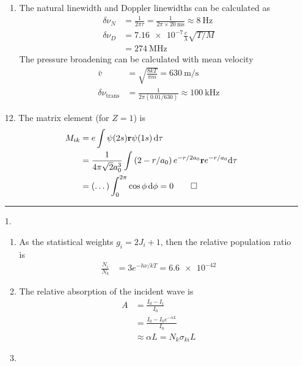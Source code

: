\documentclass{homework}
\begin{document}
\begin{enumerate}
\begin{enumerate}
			\item The natural linewidth and Doppler linewidths can be calculated as \begin{align*}
				\delta \nu_N & = \frac{1}{2 \pi \tau} = \frac{1}{2 \pi \times \SI{20}{\ms}} \approx \SI{8}{\Hz} \\
				\delta \nu_D & = \num{7.16e-7} \frac{c}{\lambda} \sqrt{T/M} \\
					& = \SI{274}{\MHz}
			\end{align*}
			The pressure broadening can be calculated with mean velocity \begin{align*}
				\bar{v} & = \sqrt{ \frac{8kT}{\pi m} } = \SI{630}{\m\per\s} \\
				\delta \nu_\mathrm{trans} & = \frac{1}{2 \pi (0.01 / 630)} \approx \SI{100}{\kHz}
			\end{align*}
		\end{enumerate}
		
		\item[12.] The matrix element (for $Z=1$) is \begin{align*}
			M_{ik} & = e \int \psi(2s) \boldsymbol{\mathrm{r}} \psi(1s) \dd{\tau} \\
				& = \frac{1}{4 \pi \sqrt{2} a_0^3} \int \left(2 - r/a_0\right) e^{-r/2a_0} \boldsymbol{\mathrm{r}} e^{-r/a_0} \dd\tau \\
				& = \left(\dots\right) \int_0^{2 \pi} \cos \phi \dd{\phi} = 0 \qed
		\end{align*}
		
		\vspace{1em}
		\hrule
		
		\item[1.] \begin{enumerate}
			\item As the statistical weights $g_i = 2 J_i  + 1$, then the relative population ratio is \begin{align*}
					\frac{N_i}{N_k} & = 3e^{-h\nu / kT} = \num{6.6e-42}
				\end{align*}
			
			\item The relative absorption of the incident wave is \begin{align*}
				A & = \frac{I_0 - I_t}{I_0} \\
					& = \frac{I_0 - I_0 e^{-\alpha L}}{I_0} \\
					& \approx \alpha L = N_k \sigma_{ki} L
			\end{align*}
		
			\item
		\end{enumerate}
	\end{enumerate}
\end{document}
